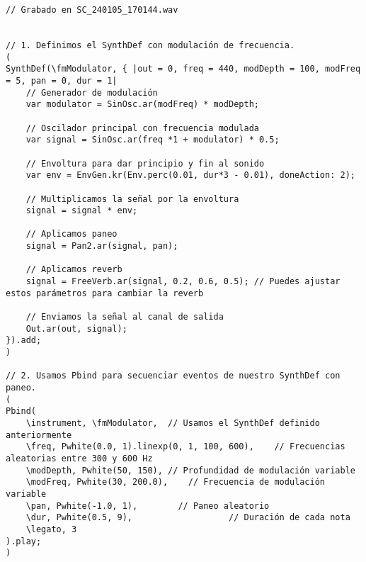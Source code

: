 \begin{minipage}[t]{1\textwidth}
    \centering
    \begin{lstlisting}[style=SuperCollider-IDE, basicstyle=\footnotesize\ttfamily, numbers=none]
// Grabado en SC_240105_170144.wav


// 1. Definimos el SynthDef con modulación de frecuencia.
(
SynthDef(\fmModulator, { |out = 0, freq = 440, modDepth = 100, modFreq = 5, pan = 0, dur = 1|
    // Generador de modulación
    var modulator = SinOsc.ar(modFreq) * modDepth;

    // Oscilador principal con frecuencia modulada
    var signal = SinOsc.ar(freq *1 + modulator) * 0.5;

    // Envoltura para dar principio y fin al sonido
    var env = EnvGen.kr(Env.perc(0.01, dur*3 - 0.01), doneAction: 2);

    // Multiplicamos la señal por la envoltura
    signal = signal * env;

    // Aplicamos paneo
    signal = Pan2.ar(signal, pan);

    // Aplicamos reverb
    signal = FreeVerb.ar(signal, 0.2, 0.6, 0.5); // Puedes ajustar estos parámetros para cambiar la reverb

    // Enviamos la señal al canal de salida
    Out.ar(out, signal);
}).add;
)

// 2. Usamos Pbind para secuenciar eventos de nuestro SynthDef con paneo.
(
Pbind(
    \instrument, \fmModulator,  // Usamos el SynthDef definido anteriormente
    \freq, Pwhite(0.0, 1).linexp(0, 1, 100, 600),    // Frecuencias aleatorias entre 300 y 600 Hz
    \modDepth, Pwhite(50, 150), // Profundidad de modulación variable
    \modFreq, Pwhite(30, 200.0),    // Frecuencia de modulación variable
    \pan, Pwhite(-1.0, 1),        // Paneo aleatorio
    \dur, Pwhite(0.5, 9),                   // Duración de cada nota
    \legato, 3
).play;
)           
    \end{lstlisting}
    \vspace{1cm}
\end{minipage}








